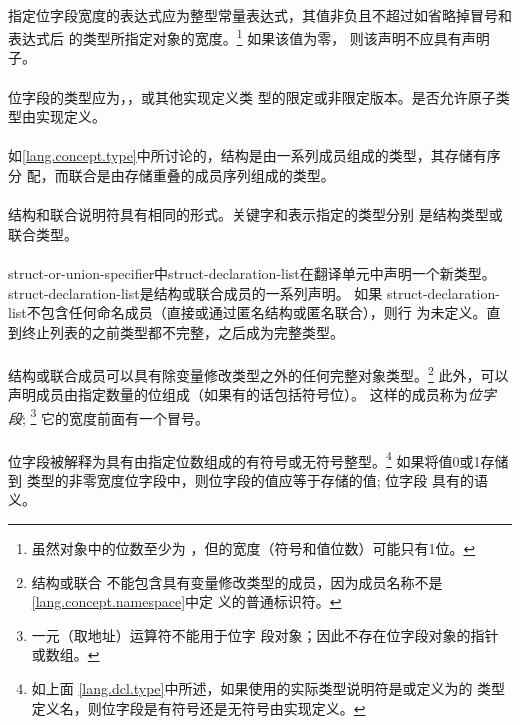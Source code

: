 {\paragraph{}
指定位字段宽度的表达式应为整型常量表达式，其值非负且不超过如省略掉冒号和表达式后
的类型所指定对象的宽度。\footnote{虽然对象中的位数至少为
，但的宽度（符号和值位数）可能只有1位。} 如果该值为零，
则该声明不应具有声明子。

\paragraph{}
位字段的类型应为，，或其他实现定义类
型的限定或非限定版本。是否允许原子类型由实现定义。

\semantic
\paragraph{}
如\ref{lang.concept.type}中所讨论的，结构是由一系列成员组成的类型，其存储有序分
配，而联合是由存储重叠的成员序列组成的类型。

\paragraph{}
结构和联合说明符具有相同的形式。关键字和表示指定的类型分别
是结构类型或联合类型。

\paragraph{}
struct-or-union-specifier中struct-declaration-list在翻译单元中声明一个新类型。
struct-declaration-list是结构或联合成员的一系列声明。 如果
struct-declaration-list不包含任何命名成员（直接或通过匿名结构或匿名联合），则行
为未定义。直到终止列表的\tm{\}}之前类型都不完整，之后成为完整类型。

\paragraph{}
结构或联合成员可以具有除变量修改类型之外的任何完整对象类型。\footnote{结构或联合
不能包含具有变量修改类型的成员，因为成员名称不是\ref{lang.concept.namespace}中定
义的普通标识符。} 此外，可以声明成员由指定数量的位组成（如果有的话包括符号位）。
这样的成员称为\textit{位字段}; \footnote{一元\tm{\&}（取地址）运算符不能用于位字
段对象；因此不存在位字段对象的指针或数组。} 它的宽度前面有一个冒号。

\paragraph{}
位字段被解释为具有由指定位数组成的有符号或无符号整型。\footnote{如上面
\ref{lang.dcl.type}中所述，如果使用的实际类型说明符是或定义为的
类型定义名，则位字段是有符号还是无符号由实现定义。} 如果将值0或1存储到
类型的非零宽度位字段中，则位字段的值应等于存储的值; 位字段
具有的语义。

}

